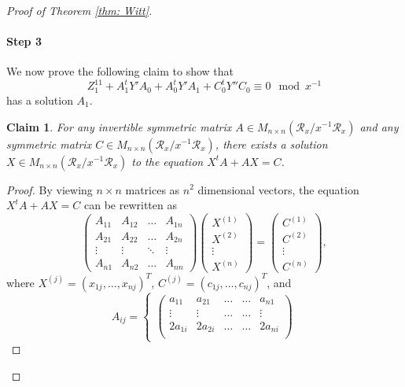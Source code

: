 \documentclass[11pt,a4paper,reqno]{amsart}
\newtheorem{claim}[theorem]{Claim}
\theoremstyle{definition}
\theoremstyle{remark}
\numberwithin{equation}{section}
\begin{document}
\begin{proof}[Proof of Theorem \ref{thm: Witt}]
    \paragraph{\textbf{Step 3}} We now prove the following claim to show that $$Z_1^{11}+A_1^tY'A_0+A_0^tY'A_1+C_0^tY''C_0\equiv 0 \mod x^{-1}$$ has a solution $A_1$.
    \begin{claim}
    \label{claim:SymmSol}
    For any invertible symmetric matrix $A\in M_{n\times n}(\mathcal{R}_x/x^{-1}\mathcal{R}_x)$ and any symmetric matrix $C\in M_{n\times n}(\mathcal{R}_x/x^{-1}\mathcal{R}_x)$, there exists a solution $X\in M_{n\times n}(\mathcal{R}_x/x^{-1}\mathcal{R}_x)$ to the equation $X^tA+AX=C$. 
    \end{claim}
    \begin{proof}By viewing $n\times n$ matrices as $n^2$ dimensional vectors, the equation $X^tA+AX=C$ can be rewritten as 
    \begin{equation}
    \label{eqn:MatrixEq}
        \begin{pmatrix}
            A_{11}&A_{12}&\dots&A_{1n}\\
            A_{21}&A_{22}&\dots&A_{2n}\\
            \vdots&\vdots&\ddots&\vdots\\
            A_{n1}&A_{n2}&\dots&A_{nn}
        \end{pmatrix}\begin{pmatrix}
            X^{(1)}\\
            X^{(2)}\\
            \vdots\\
            X^{(n)}
        \end{pmatrix}=\begin{pmatrix}
            C^{(1)}\\
            C^{(2)}\\
            \vdots \\
            C^{(n)}
        \end{pmatrix},
    \end{equation}
    where $X^{(j)}=(x_{1j},\dots, x_{nj})^T$, $C^{(j)}=(c_{1j},\dots,c_{nj})^T$, and
    \begin{equation}
        A_{ij}=\begin{cases}
            \begin{pmatrix}
                a_{11}&a_{21}&\dots&\dots&a_{n1}\\
                \vdots&\vdots&\dots&\dots&\vdots\\
                2a_{1i}&2a_{2i}&\dots&\dots&2a_{ni}\\

\end{pmatrix}
\end{cases}
\end{equation}
\end{proof}
\end{proof}
\end{document}
